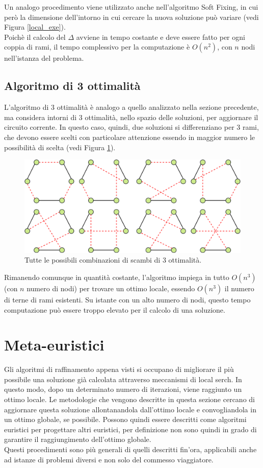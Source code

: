Un analogo procedimento viene utilizzato anche nell'algoritmo Soft Fixing, in cui però la dimensione dell'intorno in cui cercare la nuova soluzione può variare (vedi Figura \ref{local_exe}).\\
Poichè il calcolo del $\Delta$ avviene in tempo costante e deve essere fatto per ogni coppia di rami, il tempo complessivo per la computazione è $O(n^2)$, con $n$ nodi nell'istanza del problema.\\

\subsection{Algoritmo di 3 ottimalità}
L'algoritmo di 3 ottimalità è analogo a quello analizzato nella sezione precedente, ma considera intorni di 3 ottimalità, nello spazio delle soluzioni, per aggiornare il circuito corrente. In questo caso, quindi, due soluzioni si differenziano per 3 rami, che devono essere scelti con particolare attenzione essendo in maggior numero le possibilità di scelta (vedi Figura \ref{three_optimality}).
\begin{figure}[H] 
\begin{center} 
  \includegraphics[scale=0.35]{Images/3_swap}
  \caption{\footnotesize{Tutte le possibili combinazioni di scambi di 3 ottimalità.}}
  \label{three_optimality}
\end{center}
\end{figure}
Rimanendo comunque in quantità costante, l'algoritmo impiega in tutto $O(n^3)$ (con $n$ numero di nodi) per trovare un ottimo locale, essendo $O(n^3)$ il numero di terne di rami esistenti. Su istante con un alto numero di nodi, questo tempo computazione può essere troppo elevato per il calcolo di una soluzione. 
\section{Meta-euristici}
Gli algoritmi di raffinamento appena visti si occupano di migliorare il più possibile una soluzione già calcolata attraverso meccanismi di local serch. In questo modo, dopo un determinato numero di iterazioni, viene raggiunto un ottimo locale. Le metodologie che vengono descritte in questa sezione cercano di aggiornare questa soluzione allontanandola dall'ottimo locale e convogliandola in un ottimo globale, se possibile. Possono quindi essere descritti come algoritmi euristici per progettare altri euristici, per definizione non sono quindi in grado di garantire il raggiungimento dell'ottimo globale.\\
Questi procedimenti sono più generali di quelli descritti fin'ora, applicabili anche ad istanze di problemi diversi e non solo del commesso viaggiatore. 
